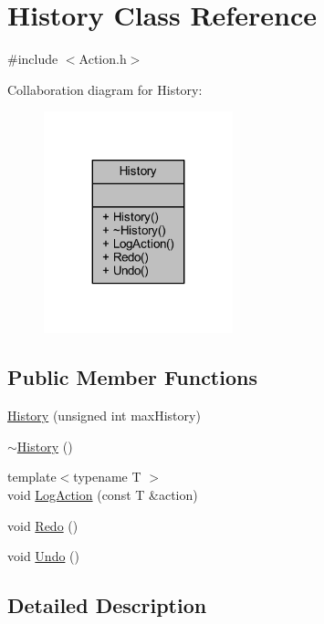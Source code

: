 \hypertarget{class_history}{}\section{History Class Reference}
\label{class_history}


{\ttfamily \#include $<$Action.\+h$>$}



Collaboration diagram for History\+:
\nopagebreak
\begin{figure}[H]
\begin{center}
\leavevmode
\includegraphics[width=155pt]{class_history__coll__graph}
\end{center}
\end{figure}
\subsection*{Public Member Functions}
\begin{DoxyCompactItemize}
\item 
\hyperlink{class_history_afa52e652306d81e61acce4f6ebb9a04d}{History} (unsigned int max\+History)
\item 
\hyperlink{class_history_a5b00b64a1ddee04e60d5a3b517fd6d4c}{$\sim$\+History} ()
\item 
{\footnotesize template$<$typename T $>$ }\\void \hyperlink{class_history_ae2286b5c19bc1a5947caf33bdc5a39b0}{Log\+Action} (const T \&action)
\item 
void \hyperlink{class_history_abc639588fdca61df2902377e08a64dd6}{Redo} ()
\item 
void \hyperlink{class_history_a4cf63a4e996f75e5c3b99b42fe56c6d3}{Undo} ()
\end{DoxyCompactItemize}


\subsection{Detailed Description}


